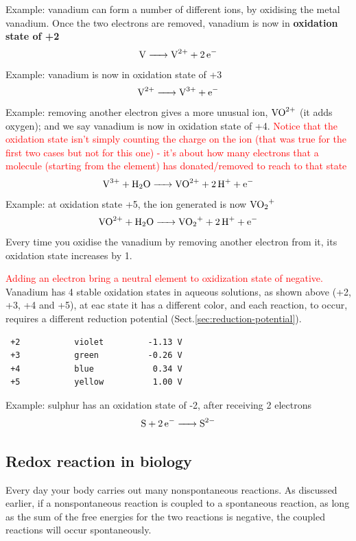 Example: vanadium can form a number of different ions, by oxidising the metal
vanadium. Once the two electrons are removed, vanadium is now in {\bf oxidation
state of +2}
\begin{equation}
\ce{V -> V^2+ + 2e-}
\end{equation}
Example: vanadium is now in oxidation state of +3
\begin{equation}
\ce{V^2+ -> V^3+ + e-}
\end{equation}
Example: removing another electron gives a more unusual ion, $\ce{VO^2+}$ (it
adds oxygen); and we say vanadium is now in oxidation state of +4.
\textcolor{red}{Notice that the oxidation state isn't simply counting the charge on the ion (that was true
for the first two cases but not for this one) - it's about how many electrons
that a molecule (starting from the element) has donated/removed to reach to that
state}
\begin{equation}
\ce{V^3+ + H2O -> VO^2+ + 2H+ + e-}
\end{equation}
Example: at oxidation state +5, the ion generated is now $\ce{VO_2^+}$
\begin{equation}
\ce{VO^2+ + H2O -> VO_2^+ + 2H+ + e-}
\end{equation}
Every time you oxidise the vanadium by removing another electron from it, its
oxidation state increases by 1.

\textcolor{red}{Adding an electron bring a neutral element to oxidization state
of negative.} Vanadium  has 4 stable oxidation states in aqueous solutions, as
shown above (+2, +3, +4 and +5), at eac state it has a different color, and
each reaction, to occur, requires a different reduction potential
(Sect.\ref{sec:reduction-potential}).
\begin{verbatim}
 +2           violet         -1.13 V
 +3           green          -0.26 V
 +4           blue            0.34 V
 +5           yellow          1.00 V 

\end{verbatim}
Example: sulphur has an oxidation state of -2, after receiving 2 electrons
\begin{equation}
\ce{S + 2e- -> S^{2-}}
\end{equation}


\subsection{Redox reaction in biology}
\label{sec:redox_reaction-biology}

Every day your body carries out many nonspontaneous reactions. As discussed
earlier, if a nonspontaneous reaction is coupled to a spontaneous reaction, as
long as the sum of the free energies for the two reactions is negative, the
coupled reactions will occur spontaneously.

